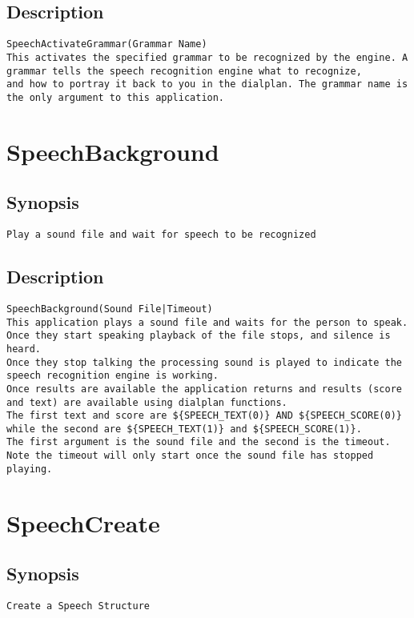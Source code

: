 \subsection{Description}
\begin{verbatim}
SpeechActivateGrammar(Grammar Name)
This activates the specified grammar to be recognized by the engine. A grammar tells the speech recognition engine what to recognize, 
and how to portray it back to you in the dialplan. The grammar name is the only argument to this application.

\end{verbatim}


\section{SpeechBackground}
\subsection{Synopsis}
\begin{verbatim}
Play a sound file and wait for speech to be recognized
\end{verbatim}
\subsection{Description}
\begin{verbatim}
SpeechBackground(Sound File|Timeout)
This application plays a sound file and waits for the person to speak. Once they start speaking playback of the file stops, and silence is heard.
Once they stop talking the processing sound is played to indicate the speech recognition engine is working.
Once results are available the application returns and results (score and text) are available using dialplan functions.
The first text and score are ${SPEECH_TEXT(0)} AND ${SPEECH_SCORE(0)} while the second are ${SPEECH_TEXT(1)} and ${SPEECH_SCORE(1)}.
The first argument is the sound file and the second is the timeout. Note the timeout will only start once the sound file has stopped playing.

\end{verbatim}


\section{SpeechCreate}
\subsection{Synopsis}
\begin{verbatim}
Create a Speech Structure
\end{verbatim}
